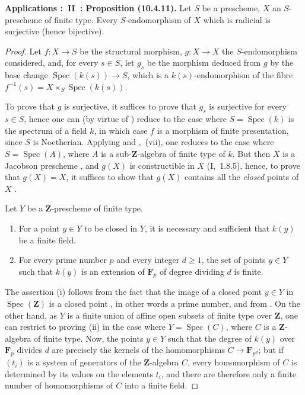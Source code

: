\begin{env}[10.4.11]
\label{IV.10.4.11}
\textbf{Applications :~II~: Proposition (10.4.11).}
Let $S$ be a prescheme, $X$ an $S$-prescheme of finite type.
Every $S$-endomorphism of $X$ which is radicial is surjective (hence bijective).
\end{env}

\begin{proof}
Let $f:X\to S$ be the structural morphism, $g:X\to X$ the $S$-endomorphism considered, and, for every $s\in S$, let $g_s$ be the morphism deduced from $g$ by the base change $\operatorname{Spec}(k(s))\to S$, which is a $k(s)$-endomorphism of the fibre $f^{-1}(s)=X\times_S\operatorname{Spec}(k(s))$.

To prove that $g$ is surjective, it suffices to prove that $g_s$ is surjective for every $s\in S$, hence one can (by virtue of ) reduce to the case where $S=\operatorname{Spec}(k)$ is the spectrum of a field $k$, in which case $f$ is a morphism of finite presentation, since $S$ is Noetherian.
Applying  and ,~(vii), one reduces to the case where $S=\operatorname{Spec}(A)$, where $A$ is a sub-$\mathbf{Z}$-algebra of finite type of $k$.
But then $X$ is a Jacobson prescheme , and $g(X)$ is constructible in $X$ (I,~1.8.5), hence, to prove that $g(X)=X$, it suffices to show that $g(X)$ contains all the \emph{closed} points of $X$ .

\begin{lemma}[10.4.11.1]
\label{IV.10.4.11.1}
Let $Y$ be a $\mathbf{Z}$-prescheme of finite type.
\begin{enumerate}[label=(\roman*)]
  \item For a point $y\in Y$ to be closed in $Y$, it is necessary and sufficient that $k(y)$ be a finite field.
  \item For every prime number $p$ and every integer $d\geq 1$, the set of points $y\in Y$ such that $k(y)$ is an extension of $\mathbf{F}_p$ of degree dividing $d$ is finite.
\end{enumerate}
\end{lemma}

The assertion (i) follows from the fact that the image of a closed point $y\in Y$ in $\operatorname{Spec}(\mathbf{Z})$ is a closed point , in other words a prime number, and from .
On the other hand, as $Y$ is a finite union of affine open subsets of finite type over $\mathbf{Z}$, one can restrict to proving (ii) in the case where $Y=\operatorname{Spec}(C)$, where $C$ is a $\mathbf{Z}$-algebra of finite type.
Now, the points $y\in Y$ such that the degree of $k(y)$ over $\mathbf{F}_p$ divides $d$ are precisely the kernels of the homomorphisms $C\to\mathbf{F}_{p^d}$; but if $(t_i)$ is a system of generators of the $\mathbf{Z}$-algebra $C$, every homomorphism of $C$ is determined by its values on the elements $t_i$, and there are therefore only a finite number of homomorphisms of $C$ into a finite field.


\end{proof}
